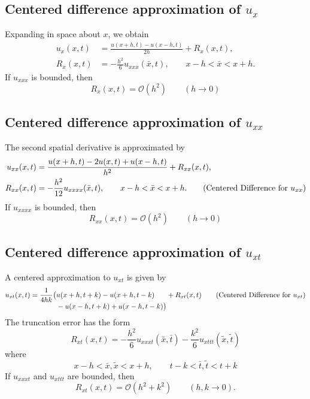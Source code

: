 \documentclass[11pt]{book}
\theoremstyle{example}
\theoremstyle{problem}
\theoremstyle{theorem}
\theoremstyle{definition}
\begin{document}
\subsection{Centered difference approximation of $u_x$}
Expanding in space about $x$, we obtain
\begin{align}
	u_x(x,t)&=\frac{u(x+h,t)-u(x-h,t)}{2h}+R_x(x,t),\\
	R_x(x,t)&=-\frac{h^2}{6}u_{xxx}(\bar{x},t),\qquad{x-h<\bar{x}<x+h}.
	\tag{Centered Difference for $u_x$}
\end{align}
If $u_{xxx}$ is bounded, then
\begin{equation*}
	R_x(x,t)=\mathcal{O}(h^2)\qquad(h\rightarrow0)
\end{equation*}
\subsection{Centered difference approximation of $u_{xx}$}
The second spatial derivative is approximated by
\begin{align}
	u_{xx}(x,t)&= \frac{u(x+h,t)-2u(x,t)+u(x-h,t)}{h^2}+R_{xx}(x,t),\\
	R_{xx}(x,t)&=-\frac{h^2}{12}u_{xxxx}(\bar{x},t),\qquad{x-h<\bar{x}<x+h}.
	\tag{Centered Difference for $u_{xx}$}
\end{align}
If $u_{xxxx}$ is bounded, then
\begin{equation*}
	R_{xx}(x,t)=\mathcal{O}(h^2)\qquad(h\rightarrow0)
\end{equation*}
\subsection{Centered difference approximation of $u_{xt}$}
A centered approximation to $u_{xt}$ is given by
\begin{equation}
	u_{xt}(x,t)=\frac{1}{4hk}
	\begin{aligned}[t]
		\bigl(&u(x+h,t+k)-u(x+h,t-k)\\
		&-u(x-h,t+k)+u(x-h,t-k)\bigr)
	\end{aligned}
	+R_{xt}(x,t)
	\tag{Centered Difference for $u_{xt}$}
\end{equation}
The truncation error has the form
\begin{equation}
	R_{xt}(x,t)=-\frac{h^2}{6}u_{xxxt}(\bar{x},\bar{t})-\frac{k^2}{6}u_{xttt}(\tilde{x},\tilde{t})
\end{equation}
where
\begin{equation*}
	x-h<\bar{x},\tilde{x}<x+h,{\qquad}t-k<\bar{t},\tilde{t}<t+k
\end{equation*}
If $u_{xxxt}$ and $u_{xttt}$ are bounded, then
\begin{equation*}
	R_{xt}(x,t)=\mathcal{O}(h^2+k^2)\qquad(h,k\rightarrow0).
\end{equation*}
\end{document}
